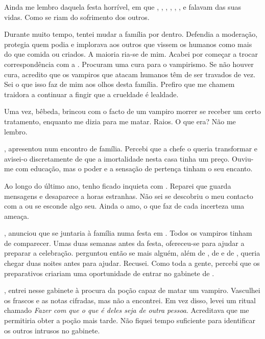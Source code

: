 {Ainda me lembro daquela festa horrível, em que , , , , , ,  e  falavam das suas vidas. Como se riam do sofrimento dos outros.

Durante muito tempo, tentei mudar a família por dentro. Defendia a moderação, protegia quem podia e implorava aos outros que vissem os humanos como mais do que comida ou criados. A maioria ria-se de mim. Acabei por começar a trocar correspondência com a . Procuram uma cura para o vampirismo. Se não houver cura, acredito que os vampiros que atacam humanos têm de ser travados de vez. Sei o que isso faz de mim aos olhos desta família. Prefiro que me chamem traidora a continuar a fingir que a crueldade é lealdade.

Uma vez, bêbeda,  brincou com o facto de um vampiro morrer se receber um certo tratamento, enquanto me dizia para me matar. Raios. O que era? Não me lembro.

,  apresentou  num encontro de família. Percebi que a chefe o queria transformar e avisei-o discretamente de que a imortalidade nesta casa tinha um preço. Ouviu-me com educação, mas o poder e a sensação de pertença tinham o seu encanto.

Ao longo do último ano, tenho ficado inquieta com . Reparei que guarda mensagens e desaparece a horas estranhas. Não sei se descobriu o meu contacto com a  ou se esconde algo seu. Ainda o amo, o que faz de cada incerteza uma ameaça.

,  anunciou que  se juntaria à família numa festa em . Todos os vampiros tinham de comparecer. Umas duas semanas antes da festa,  ofereceu-se para ajudar a preparar a celebração.  perguntou então se mais alguém, além de , de  e de , queria chegar duas noites antes para ajudar. Recusei. Como toda a gente, percebi que os preparativos criariam uma oportunidade de entrar no gabinete de .

, entrei nesse gabinete à procura da poção capaz de matar um vampiro. Vasculhei os frascos e as notas cifradas, mas não a encontrei. Em vez disso, levei um ritual chamado \textit{Fazer com que o que é deles seja de outra pessoa}. Acreditava que me permitiria obter a poção mais tarde. Não fiquei tempo suficiente para identificar os outros intrusos no gabinete.

}
